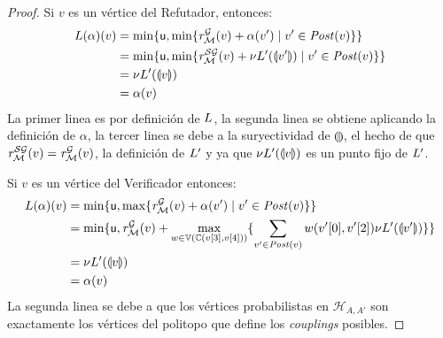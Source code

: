 \begin{proof}
   Si $v$ es un vértice del Refutador,  entonces:
\begin{align}
   \Bellman(\alpha)(v) & =  \min \{\upperbound,  \min \{\mreward^\StochG(v)  + \alpha(v') \mid v' \in \post(v) \} \}  \\
                                    & =  \min \{\upperbound,  \min \{\mreward^\SymbG(v)  +\nu \Bellman'(\llparenthesis v'  \rrparenthesis) \mid v' \in \post(v) \} \} \\  
                                    & = \nu \Bellman'(\llparenthesis v  \rrparenthesis) \\
                                    & = \alpha(v)           
\end{align}
 La primer linea es por definición de $\Bellman$, la segunda linea se obtiene aplicando la definición de $\alpha$, la tercer linea se debe a la suryectividad de  $\llparenthesis \rrparenthesis$,  el hecho de que $\mreward^\SymbG(v) = \mreward^\StochG(v) $, la definición de $\Bellman'$ y ya que $\nu \Bellman'(\llparenthesis v  \rrparenthesis)$ es un punto fijo de $\Bellman'$.

    Si $v$ es un vértice del Verificador entonces:
\begin{align}
   \Bellman(\alpha)(v) & =   \min \{ \upperbound, \max \{\mreward^\StochG(v) + \alpha(v') \mid v' \in \post(v) \} \}  \\
                                    & =   \min \{ \upperbound, \mreward^\StochG(v) + \max_{w \in \vertices{\couplings{\pr{3}{v}}{\pr{4}{v}}}} \{\sum_{v' \in \post(v)} w(\pr{0}{v'},\pr{2}{v'})  \nu \Bellman'(\llparenthesis v' \rrparenthesis) \} \} \\  
                                    & = \nu \Bellman'(\llparenthesis v  \rrparenthesis) \\
                                    & = \alpha(v)           
\end{align}
    La segunda linea se debe a que los vértices probabilistas en $\mathcal{H}_{A,A'}$ son exactamente los vértices del politopo que define los \emph{couplings} posibles.


\end{proof}
